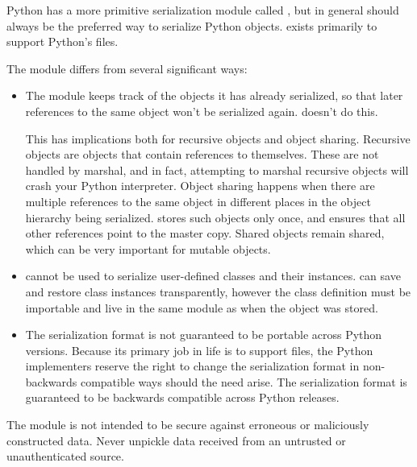 Python has a more primitive serialization module called
, but in general
 should always be the preferred way to serialize Python
objects.   exists primarily to support Python's
 files.

The  module differs from  several
significant ways:

\begin{itemize}

\item The  module keeps track of the objects it has
      already serialized, so that later references to the same object
      won't be serialized again.   doesn't do this.

      This has implications both for recursive objects and object
      sharing.  Recursive objects are objects that contain references
      to themselves.  These are not handled by marshal, and in fact,
      attempting to marshal recursive objects will crash your Python
      interpreter.  Object sharing happens when there are multiple
      references to the same object in different places in the object
      hierarchy being serialized.   stores such objects
      only once, and ensures that all other references point to the
      master copy.  Shared objects remain shared, which can be very
      important for mutable objects.

\item {} cannot be used to serialize user-defined
      classes and their instances.   can save and
      restore class instances transparently, however the class
      definition must be importable and live in the same module as
      when the object was stored.

\item The  serialization format is not guaranteed to
      be portable across Python versions.  Because its primary job in
      life is to support  files, the Python implementers
      reserve the right to change the serialization format in
      non-backwards compatible ways should the need arise.  The
       serialization format is guaranteed to be
      backwards compatible across Python releases.

\end{itemize}

\begin{notice}[warning]
The  module is not intended to be secure against
erroneous or maliciously constructed data.  Never unpickle data
received from an untrusted or unauthenticated source.
\end{notice}

